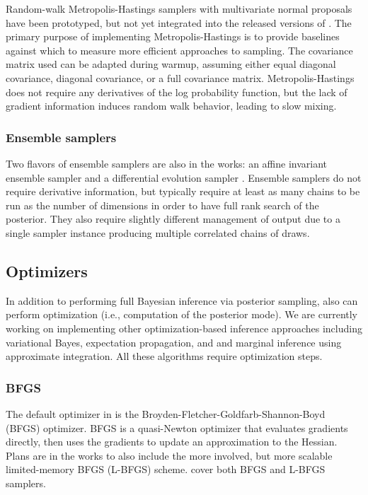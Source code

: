 \documentclass[article]{jss}
\begin{document}
Random-walk Metropolis-Hastings samplers with multivariate normal
proposals have been prototyped, but not yet integrated into the
released versions of .  The primary purpose of
implementing Metropolis-Hastings is to provide baselines against which
to measure more efficient approaches to sampling.  The covariance
matrix used can be adapted during warmup, assuming either equal
diagonal covariance, diagonal covariance, or a full covariance matrix.
Metropolis-Hastings does not require any derivatives of the log
probability function, but the lack of gradient information induces
random walk behavior, leading to slow mixing.


\subsubsection{Ensemble samplers}

Two flavors of ensemble samplers are also in the works: an affine invariant
ensemble sampler \citep{GoodmanWeare:2010} and a differential
evolution sampler \citep{TerBraak:2006}.  Ensemble samplers do not
require derivative information, but typically require at least as many
chains to be run as the number of dimensions in order to have full
rank search of the posterior.  They also require slightly different
management of output due to a single sampler instance producing
multiple correlated chains of draws.

\subsection{Optimizers}

In addition to performing full Bayesian inference via posterior
sampling,  also can perform optimization (i.e., computation of the
posterior mode).  We are currently working on implementing other
optimization-based inference approaches including variational Bayes,
expectation propagation, and and marginal inference using approximate
integration.  All these algorithms require optimization steps.

\subsubsection{BFGS}

The default optimizer in  is the
Broyden-Fletcher-Goldfarb-Shannon-Boyd (BFGS) optimizer.  BFGS is a
quasi-Newton optimizer that evaluates gradients directly, then uses
the gradients to update an approximation to the Hessian.  Plans are in
the works to also include the more involved, but more scalable
limited-memory BFGS (L-BFGS) scheme.  \citet{NocedalWright:2006} cover
both BFGS and L-BFGS samplers.
\end{document}
